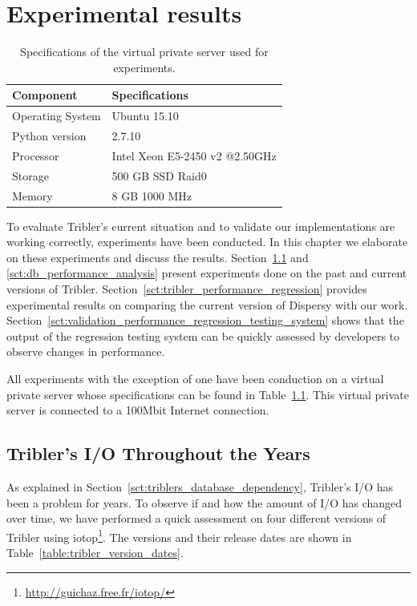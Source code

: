 \chapter{Experimental results}
\label{cpt:experiments}

\begin{table}[h]
	\centering
	\caption{Specifications of the virtual private server used for experiments.}
	\label{table:virtual_machine_specs}
	\begin{tabular}{l|l}
		\textbf{Component} 		& \textbf{Specifications} \\ \hline
		Operating System   		& Ubuntu 15.10 \\
		Python version			& 2.7.10 \\
		Processor				& Intel Xeon E5-2450 v2 @2.50GHz \\ 
		Storage					& 500 GB SSD Raid0  \\ 
		Memory					& 8 GB 1000 MHz  \\
	\end{tabular}
\end{table}

To evaluate Tribler's current situation and to validate our implementations are working correctly, experiments have been conducted.
In this chapter we elaborate on these experiments and discuss the results. 
Section~\ref{sct:tribler_io_past} and \ref{sct:db_performance_analysis} present experiments done on the past and current versions of Tribler.
Section~\ref{sct:tribler_performance_regression} provides experimental results on comparing the current version of Dispersy with our work.
Section~\ref{sct:validation_performance_regression_testing_system} shows that the output of the regression testing system can be quickly assessed by developers to observe changes in performance.

All experiments with the exception of one have been conduction on a virtual private server whose specifications can be found in Table~\ref{table:virtual_machine_specs}.
This virtual private server is connected to a 100Mbit Internet connection.

\section{Tribler's I/O Throughout the Years}
\label{sct:tribler_io_past}
As explained in Section~\ref{sct:triblers_database_dependency}, Tribler's I/O has been a problem for years.
To observe if and how the amount of I/O has changed over time, we have performed a quick assessment on four different versions of Tribler using iotop\footnote{\url{http://guichaz.free.fr/iotop/}}.
The versions and their release dates are shown in Table~\ref{table:tribler_version_dates}.

